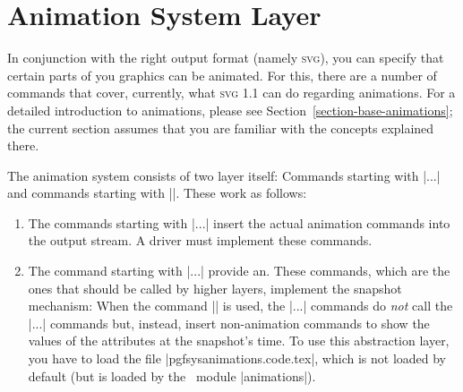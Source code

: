 %
%
%


\section{Animation System Layer}
\label{section-pgfsys-anim}

\begin{codeexample}
\makeatletter

\def\animationexample#1#2#3{%
  \tikz[fill=blue!25, draw=blue, ultra thick] {
    \pgfidrefnextuse{\objid}{#1}
    \pgfsysanimkeywhom{\objid}{#2}
    \pgfidrefnextuse{\nodeid}{node}
    \pgfsysanimkeyevent{\nodeid}{}{click}{}{begin}
    #3
    \node [font=\footnotesize, circle, fill, draw, align=center]
      (node) {Click \\ here};
  }%
}
\end{codeexample}

In conjunction with the right output format (namely \textsc{svg}), you can
specify that certain parts of you graphics can be animated. For this, there are
a number of commands that cover, currently, what \textsc{svg 1.1} can do
regarding animations. For a detailed introduction to animations, please see
Section~\ref{section-base-animations}; the current section assumes that you are
familiar with the concepts explained there.

The animation system consists of two layer itself: Commands starting with
|\pgfsys@anim...| and commands starting with |\pgfsysanim|. These work as
follows:
%
\begin{enumerate}
    \item The commands starting with |\pgfsys@anim...| insert the actual
        animation commands into the output stream. A driver must implement
        these commands.
    \item The command starting with |\pgfsysanim...| provide an. These
        commands, which are the ones that should be called by higher layers,
        implement the snapshot mechanism: When the command
        |\pgfsysanimsnapshot| is used, the |\pgfsysanim...| commands do
        \emph{not} call the |\pgfsys@anim...| commands but, instead, insert
        non-animation commands to show the values of the attributes at the
        snapshot's time. To use this abstraction layer, you have to load the
        file |pgfsysanimations.code.tex|, which is not loaded by default (but
        is loaded by the \pgfname\ module |animations|).
\end{enumerate}

